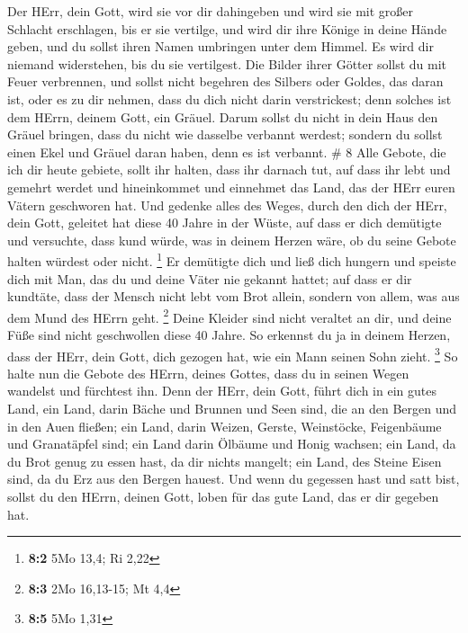 Der HErr, dein Gott, wird sie vor dir dahingeben und wird sie mit großer
Schlacht erschlagen, bis er sie vertilge,  und wird dir
ihre Könige in deine Hände geben, und du sollst ihren Namen umbringen
unter dem Himmel. Es wird dir niemand widerstehen, bis du sie
vertilgest.  Die Bilder ihrer Götter sollst du mit Feuer
verbrennen, und sollst nicht begehren des Silbers oder Goldes, das daran
ist, oder es zu dir nehmen, dass du dich nicht darin verstrickest; denn
solches ist dem HErrn, deinem Gott, ein Gräuel.  Darum
sollst du nicht in dein Haus den Gräuel bringen, dass du nicht wie
dasselbe verbannt werdest; sondern du sollst einen Ekel und Gräuel daran
haben, denn es ist verbannt. \# 8  Alle Gebote, die ich dir
heute gebiete, sollt ihr halten, dass ihr darnach tut, auf dass ihr lebt
und gemehrt werdet und hineinkommet und einnehmet das Land, das der HErr
euren Vätern geschworen hat.  Und gedenke alles des Weges,
durch den dich der HErr, dein Gott, geleitet hat diese 40 Jahre in der
Wüste, auf dass er dich demütigte und versuchte, dass kund würde, was in
deinem Herzen wäre, ob du seine Gebote halten würdest oder nicht.
\footnote{\textbf{8:2} 5Mo 13,4; Ri 2,22}  Er demütigte dich
und ließ dich hungern und speiste dich mit Man, das du und deine Väter
nie gekannt hattet; auf dass er dir kundtäte, dass der Mensch nicht lebt
vom Brot allein, sondern von allem, was aus dem Mund des HErrn geht.
\footnote{\textbf{8:3} 2Mo 16,13-15; Mt 4,4}  Deine Kleider
sind nicht veraltet an dir, und deine Füße sind nicht geschwollen diese
40 Jahre.  So erkennst du ja in deinem Herzen, dass der
HErr, dein Gott, dich gezogen hat, wie ein Mann seinen Sohn zieht.
\footnote{\textbf{8:5} 5Mo 1,31}  So halte nun die Gebote
des HErrn, deines Gottes, dass du in seinen Wegen wandelst und fürchtest
ihn.  Denn der HErr, dein Gott, führt dich in ein gutes
Land, ein Land, darin Bäche und Brunnen und Seen sind, die an den Bergen
und in den Auen fließen;  ein Land, darin Weizen, Gerste,
Weinstöcke, Feigenbäume und Granatäpfel sind; ein Land darin Ölbäume und
Honig wachsen;  ein Land, da du Brot genug zu essen hast, da
dir nichts mangelt; ein Land, des Steine Eisen sind, da du Erz aus den
Bergen hauest.  Und wenn du gegessen hast und satt bist,
sollst du den HErrn, deinen Gott, loben für das gute Land, das er dir
gegeben hat.

